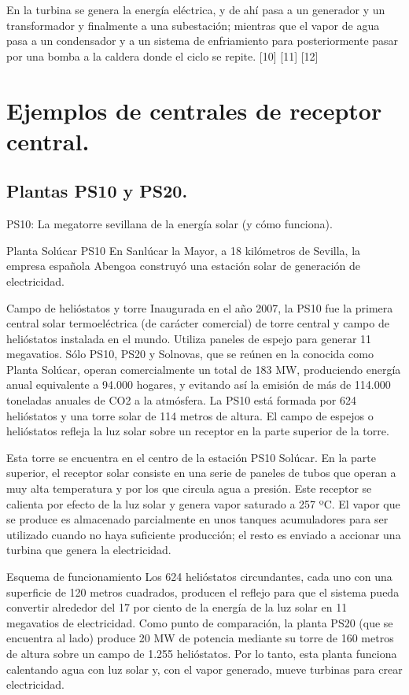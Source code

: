 \documentclass[12pt]{article}
\begin{document}
En la turbina se genera la energía eléctrica, y de ahí pasa a un generador y un transformador y finalmente a una subestación; mientras que el vapor de agua pasa a un condensador y a un sistema de enfriamiento para posteriormente pasar por una bomba a la caldera donde el ciclo se repite. [10] [11] [12]

\section{Ejemplos de centrales de receptor central.}
\subsection{Plantas PS10 y PS20.}

PS10: La megatorre sevillana de la energía solar (y cómo funciona).

Planta Solúcar PS10
En Sanlúcar la Mayor, a 18 kilómetros de Sevilla, la empresa española Abengoa construyó una estación solar de generación de electricidad.

Campo de helióstatos y torre
Inaugurada en el año 2007, la PS10 fue la primera central solar termoeléctrica (de carácter comercial) de torre central y campo de helióstatos instalada en el mundo. Utiliza paneles de espejo para generar 11 megavatios.
Sólo PS10, PS20 y Solnovas, que se reúnen en la conocida como Planta Solúcar, operan comercialmente un total de 183 MW, produciendo energía anual equivalente a 94.000 hogares, y evitando así la emisión de más de 114.000 toneladas anuales de CO2 a la atmósfera.
La PS10 está formada por 624 helióstatos y una torre solar de 114 metros de altura. El campo de espejos o helióstatos refleja la luz solar sobre un receptor en la parte superior de la torre.

Esta torre se encuentra en el centro de la estación PS10 Solúcar. En la parte superior, el receptor solar consiste en una serie de paneles de tubos que operan a muy alta temperatura y por los que circula agua a presión. Este receptor se calienta por efecto de la luz solar y genera vapor saturado a 257 ºC. El vapor que se produce es almacenado parcialmente en unos tanques acumuladores para ser utilizado cuando no haya suficiente producción; el resto es enviado a accionar una turbina que genera la electricidad.

Esquema de funcionamiento
Los 624 helióstatos circundantes, cada uno con una superficie de 120 metros cuadrados, producen el reflejo para que el sistema pueda convertir alrededor del 17 por ciento de la energía de la luz solar en 11 megavatios de electricidad. Como punto de comparación, la planta PS20 (que se encuentra al lado) produce 20 MW de potencia mediante su torre de 160 metros de altura sobre un campo de 1.255 helióstatos.
Por lo tanto, esta planta funciona calentando agua con luz solar y, con el vapor generado, mueve turbinas para crear electricidad.
\end{document}

